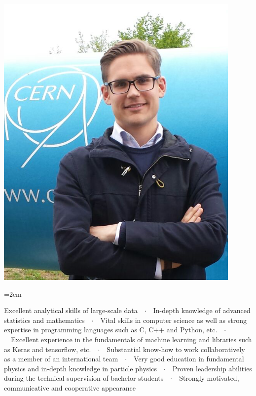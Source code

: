 \documentclass[xcolor=dvipsnames]{scrartcl}
\newcommand{\Description}[1]{\hangindent=2em\hangafter=0\noindent\raggedright\footnotesize{#1}\par\normalsize\vspace{1em}} %
\begin{document}
\begin{cv}{}
\begin{minipage}{0.7\textwidth}
\end{minipage}
\begin{minipage}{0.25\textwidth}%
  \includegraphics[width=0.9\textwidth]{dhandl.png}
\end{minipage}


\vspace{1em} %

\noindent{}\vspace{1em} %

\Description{Excellent analytical skills of large-scale data\ \ $\cdotp$\ \ In-depth knowledge of advanced statistics and mathematics\ \ $\cdotp$\ \ Vital skills in computer science as well as strong expertise in programming languages such as C, C++ and Python, etc.\ \ $\cdotp$\ \ Excellent experience in the fundamentals of machine learning and libraries such as Keras and tensorflow, etc.\ \ $\cdotp$\ \ Substantial know-how to work collaboratively as a member of an international team\ \ $\cdotp$\ \ Very good education in fundamental physics and in-depth knowledge in particle physics\ \ $\cdotp$\ \ Proven leadership abilities during the technical supervision of bachelor students\ \ $\cdotp$\ \ Strongly motivated, communicative and cooperative appearance}\vspace{2em} %


\end{cv}
\end{document}
